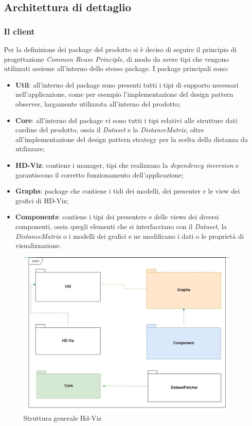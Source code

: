 \documentclass[../manuale_sviluppatore.tex]{subfiles}
\begin{document}
\subsection{Architettura di dettaglio}
\subsubsection{Il client}

Per la definizione dei package del prodotto si è deciso di seguire il principio di progettazione 
\emph{Common Reuse Principle}, di modo da avere tipi che vengono utilizzati assieme all'interno 
dello stesso package.
I package principali sono:
\begin{itemize}
	\item \textbf{Util}: all'interno del package sono presenti tutti i tipi di supporto necessari 
	nell'applicazione, come per esempio l'implementazione del design pattern observer, largamente 
	utilizzata all'interno del prodotto;
	\item \textbf{Core}: all'interno del package vi sono tutti i tipi relativi alle strutture dati 
	cardine del prodotto, ossia il \emph{Dataset} e la \emph{DistanceMatrix}, oltre 
	all'implementazione del design pattern strategy per la scelta della distanza da utilizzare;
	\item \textbf{HD-Viz}: contiene i manager, tipi che realizzano la \emph{dependency inversion} e 
	garantiscono il corretto funzionamento dell'applicazione;
	\item \textbf{Graphs}: package che contiene i tidi dei modelli, dei presenter e le view dei 
	grafici di HD-Viz;
	\item \textbf{Components}: contiene i tipi dei presenters e delle views dei diversi componenti, 
	ossia quegli elementi che si interfacciano con il \emph{Dataset}, la \emph{DistanceMatrix} o i 
	modelli dei grafici e ne modificano i dati o le proprietà di visualizzazione.
\end{itemize}

\begin{figure}[H]
	\centering
	\includegraphics[width=18cm]{img/core.jpg}
	\caption{Struttura generale Hd-Viz}
\end{figure}
\end{document}
